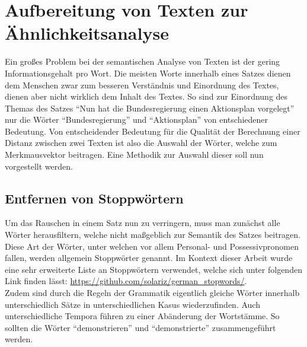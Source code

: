 \section{Aufbereitung von Texten zur Ähnlichkeitsanalyse}
\label{sec:aufbereitung_text}
Ein großes Problem bei der semantischen Analyse von Texten ist der gering Informationsgehalt pro Wort. Die meisten Worte innerhalb eines Satzes dienen dem Menschen zwar zum besseren Verständnis und Einordnung des Textes, dienen aber nicht wirklich dem Inhalt des Textes. So sind zur Einordnung des Themas des Satzes "`Nun hat die Bundesregierung einen Aktionsplan vorgelegt"' nur die Wörter "`Bundesregierung"' und "`Aktionsplan"' von entschiedener Bedeutung. Von entscheidender Bedeutung für die Qualität der Berechnung einer Distanz zwischen zwei Texten ist also die Auswahl der Wörter, welche zum Merkmausvektor beitragen. Eine Methodik zur Auswahl dieser soll nun vorgestellt werden.
\subsection{Entfernen von Stoppwörtern}
Um das Rauschen in einem Satz nun zu verringern, muss man zunächst alle Wörter herausfiltern, welche nicht maßgeblich zur Semantik des Satzes beitragen. Diese Art der Wörter, unter welchen vor allem Personal- und Possessivpronomen fallen, werden allgemein Stoppwörter genannt. Im Kontext dieser Arbeit wurde eine sehr erweiterte Liste an Stoppwörtern verwendet, welche sich unter folgenden Link finden lässt: \url{https://github.com/solariz/german_stopwords/}. \\ \newline
Zudem sind durch die Regeln der Grammatik eigentlich gleiche Wörter innerhalb unterschiedlich Sätze in unterschiedlichen Kasus wiederzufinden. Auch unterschiedliche Tempora führen zu einer Abänderung der Wortstämme. So sollten die Wörter "`demonstrieren"' und "`demonstrierte"' zusammengeführt werden.
